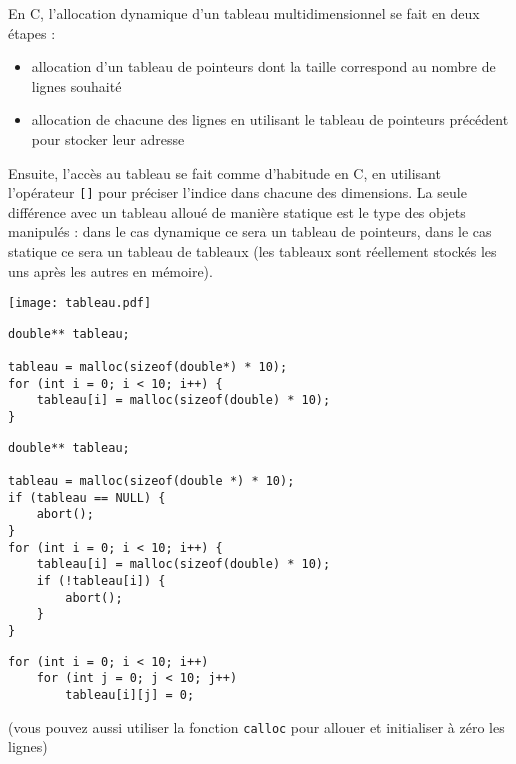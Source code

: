 \documentclass[10pt]{article}\usepackage[enonce]{exemptty}
\begin{document}
 En C, l'allocation dynamique d'un tableau
multidimensionnel se fait
en deux étapes :\\
\begin{minipage}{.5\linewidth}
  \begin{itemize}
  \item allocation d'un tableau de pointeurs dont la taille correspond au
    nombre de lignes souhaité
  \item allocation de chacune des lignes en utilisant le tableau de pointeurs
    précédent pour stocker leur adresse
  \end{itemize}

  Ensuite, l'accès au tableau se fait comme d'habitude en C, en utilisant
  l'opérateur \verb~[]~ pour préciser l'indice dans chacune des dimensions. La seule
  différence avec un tableau alloué de manière statique est le type des objets
  manipulés : dans le cas dynamique ce sera un tableau de pointeurs, dans le
  cas statique ce sera un tableau de tableaux (les tableaux sont réellement
  stockés les uns après les autres en mémoire).

\end{minipage}\hfill\begin{minipage}{.48\linewidth}
  \texttt{[image: tableau.pdf]}
\end{minipage}


\begin{Verbatim}[label=Exemple: allocation d'un tableau de 10*10 doubles (sans aucune vérification)]
double** tableau;

tableau = malloc(sizeof(double*) * 10);
for (int i = 0; i < 10; i++) {
    tableau[i] = malloc(sizeof(double) * 10);
}
\end{Verbatim}

\noindent\begin{minipage}{.64\linewidth}
\begin{Verbatim}[label=Idem avec gestion des erreurs]
double** tableau;

tableau = malloc(sizeof(double *) * 10);
if (tableau == NULL) {
    abort();
}
for (int i = 0; i < 10; i++) {
    tableau[i] = malloc(sizeof(double) * 10);
    if (!tableau[i]) {
        abort();
    }
}
\end{Verbatim}
\end{minipage}
\hfill
\begin{minipage}{.35\linewidth}
\begin{Verbatim}[label=Initialisation des éléments,numbers=right]    
for (int i = 0; i < 10; i++)
    for (int j = 0; j < 10; j++)
        tableau[i][j] = 0;
\end{Verbatim}

(vous pouvez aussi utiliser la fonction \verb~calloc~ pour allouer et initialiser à zéro les lignes)
\end{minipage}
\end{document}
